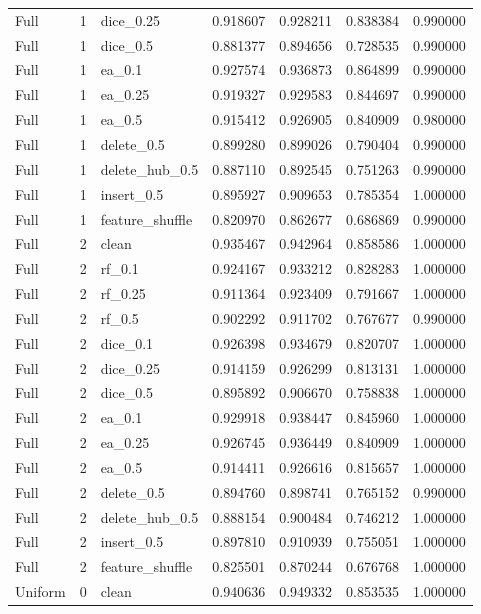 \documentclass[UTF8,a4paper,11pt,fontset=fandol]{ctexart}
\begin{document}
{\begin{longtable}{lrlrrrr}
Full & 1 & dice\_0.25 & 0.918607 & 0.928211 & 0.838384 & 0.990000 \\
Full & 1 & dice\_0.5 & 0.881377 & 0.894656 & 0.728535 & 0.990000 \\
Full & 1 & ea\_0.1 & 0.927574 & 0.936873 & 0.864899 & 0.990000 \\
Full & 1 & ea\_0.25 & 0.919327 & 0.929583 & 0.844697 & 0.990000 \\
Full & 1 & ea\_0.5 & 0.915412 & 0.926905 & 0.840909 & 0.980000 \\
Full & 1 & delete\_0.5 & 0.899280 & 0.899026 & 0.790404 & 0.990000 \\
Full & 1 & delete\_hub\_0.5 & 0.887110 & 0.892545 & 0.751263 & 0.990000 \\
Full & 1 & insert\_0.5 & 0.895927 & 0.909653 & 0.785354 & 1.000000 \\
Full & 1 & feature\_shuffle & 0.820970 & 0.862677 & 0.686869 & 0.990000 \\
Full & 2 & clean & 0.935467 & 0.942964 & 0.858586 & 1.000000 \\
Full & 2 & rf\_0.1 & 0.924167 & 0.933212 & 0.828283 & 1.000000 \\
Full & 2 & rf\_0.25 & 0.911364 & 0.923409 & 0.791667 & 1.000000 \\
Full & 2 & rf\_0.5 & 0.902292 & 0.911702 & 0.767677 & 0.990000 \\
Full & 2 & dice\_0.1 & 0.926398 & 0.934679 & 0.820707 & 1.000000 \\
Full & 2 & dice\_0.25 & 0.914159 & 0.926299 & 0.813131 & 1.000000 \\
Full & 2 & dice\_0.5 & 0.895892 & 0.906670 & 0.758838 & 1.000000 \\
Full & 2 & ea\_0.1 & 0.929918 & 0.938447 & 0.845960 & 1.000000 \\
Full & 2 & ea\_0.25 & 0.926745 & 0.936449 & 0.840909 & 1.000000 \\
Full & 2 & ea\_0.5 & 0.914411 & 0.926616 & 0.815657 & 1.000000 \\
Full & 2 & delete\_0.5 & 0.894760 & 0.898741 & 0.765152 & 0.990000 \\
Full & 2 & delete\_hub\_0.5 & 0.888154 & 0.900484 & 0.746212 & 1.000000 \\
Full & 2 & insert\_0.5 & 0.897810 & 0.910939 & 0.755051 & 1.000000 \\
Full & 2 & feature\_shuffle & 0.825501 & 0.870244 & 0.676768 & 1.000000 \\
Uniform & 0 & clean & 0.940636 & 0.949332 & 0.853535 & 1.000000 \\

\end{longtable}}
\end{document}
